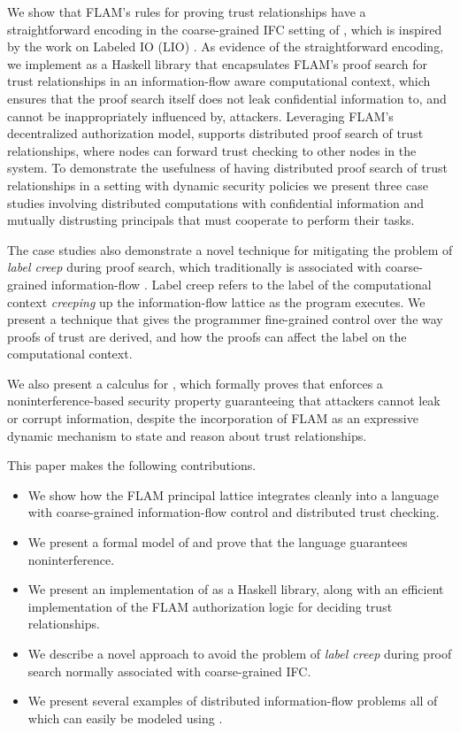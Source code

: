 We show that FLAM's rules for proving trust relationships have a straightforward encoding in the coarse-grained IFC setting of \lang{}, which is inspired by the work on Labeled IO (LIO) \cite{SRMMlio}. As evidence of the straightforward encoding, we implement \lang{} as a Haskell library \cite{flamiolib} that encapsulates FLAM's proof search for trust relationships in an information-flow aware computational context, which ensures that the proof search itself does not leak confidential information to, and cannot be inappropriately influenced by, attackers. Leveraging FLAM's decentralized authorization model, \lang{} supports distributed proof search of trust relationships, where nodes can forward trust checking to other nodes in the system. To demonstrate the usefulness of having distributed proof search of trust relationships in a setting with dynamic security policies we present three case studies involving distributed computations with confidential information and mutually distrusting principals that must cooperate to perform their tasks.

The case studies also demonstrate a novel technique for mitigating the problem of \emph{label creep} during proof search, which traditionally is associated with coarse-grained information-flow \cite{SRMMlio}. Label creep refers to the label of the computational context \emph{creeping} up the information-flow lattice as the program executes. We present a technique that gives the programmer fine-grained control over the way proofs of trust are derived, and how the proofs can affect the label on the computational context.

We also present a calculus for \lang{}, which formally proves that \lang{} enforces a noninterference-based \cite{6234468} security property guaranteeing that attackers cannot leak or corrupt information, despite the incorporation of FLAM as an expressive dynamic mechanism to state and reason about trust relationships.

This paper makes the following contributions.
\begin{itemize}
    \item We show how the FLAM principal lattice integrates cleanly into a language with coarse-grained information-flow control and distributed trust checking.
    \item We present a formal model of \lang{} and prove that the language guarantees noninterference.
    \item We present an implementation of \lang{} as a Haskell library, along with an efficient implementation of the FLAM authorization logic for deciding trust relationships.
    \item We describe a novel approach to avoid the problem of \emph{label creep} during proof search normally associated with coarse-grained IFC.
    \item We present several examples of distributed information-flow problems all of which can easily be modeled using \lang.
\end{itemize}

